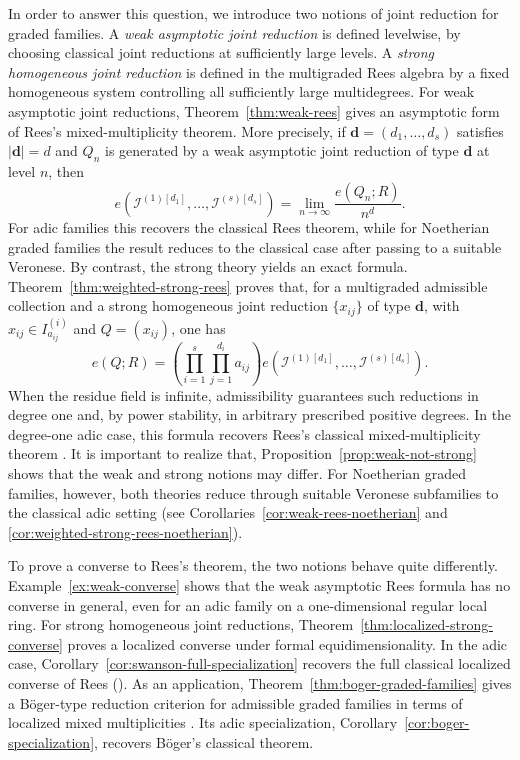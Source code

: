 \documentclass[reqno,12pt]{amsart}
\theoremstyle{plain}
\theoremstyle{definition}
\theoremstyle{remark}
\numberwithin{equation}{section}
\begin{document}
In order to answer this question, we introduce two notions of joint reduction for
graded families. A \emph{weak asymptotic joint reduction} is defined
levelwise, by choosing classical joint reductions at sufficiently large
levels. A \emph{strong homogeneous joint reduction} is defined in the
multigraded Rees algebra by a fixed homogeneous system controlling all
sufficiently large multidegrees. For weak asymptotic joint reductions, Theorem~\ref{thm:weak-rees}
gives an asymptotic form of Rees's mixed-multiplicity theorem. More
precisely, if $\mathbf d=(d_1,\ldots,d_s)$ satisfies $|\mathbf d|=d$
and $Q_n$ is generated by a weak asymptotic joint reduction of type
$\mathbf d$ at level $n$, then
\[
e\!\left(
\mathcal I^{(1)[d_1]},\ldots,
\mathcal I^{(s)[d_s]}
\right)
=
\lim_{n\to\infty}\frac{e(Q_n;R)}{n^d}.
\]
For adic families this recovers the classical Rees theorem, while for
Noetherian graded families the result reduces to the classical case
after passing to a suitable Veronese. By contrast, the strong theory yields an exact formula.
Theorem~\ref{thm:weighted-strong-rees} proves that, for a multigraded
admissible collection and a strong homogeneous joint reduction
$\{x_{ij}\}$ of type $\mathbf d$, with
$x_{ij}\in I_{a_{ij}}^{(i)}$ and $Q=(x_{ij})$, one has
\[
e(Q;R)
=
\left(
\prod_{i=1}^{s}\prod_{j=1}^{d_i}a_{ij}
\right)
e\!\left(
\mathcal I^{(1)[d_1]},\ldots,
\mathcal I^{(s)[d_s]}
\right).
\]
When the residue field is infinite, admissibility guarantees such
reductions in degree one and, by power stability, in arbitrary
prescribed positive degrees. In the degree-one adic case, this formula
recovers Rees's classical mixed-multiplicity theorem
\cite[Theorem~17.4.9]{SwansonHuneke}. It is important to realize that, Proposition~\ref{prop:weak-not-strong} shows that the weak and strong
notions may differ. For Noetherian graded families, however, both
theories reduce through suitable Veronese subfamilies to the classical
adic setting (see Corollaries~\ref{cor:weak-rees-noetherian} and
\ref{cor:weighted-strong-rees-noetherian}).

To prove a converse to Rees's theorem, the two notions behave quite
differently. Example~\ref{ex:weak-converse} shows that the weak
asymptotic Rees formula has no converse in general, even for an adic
family on a one-dimensional regular local ring. For strong homogeneous joint reductions,
Theorem~\ref{thm:localized-strong-converse} proves a localized converse
under formal equidimensionality. In the adic case,  Corollary~\ref{cor:swanson-full-specialization} recovers the full classical
localized converse of Rees
(\cite[Theorem~17.6.1]{SwansonHuneke}). As an application,
Theorem~\ref{thm:boger-graded-families} gives a B\"oger-type reduction
criterion for admissible graded families in terms of localized mixed
multiplicities \cite{Boger1969}. Its adic specialization,
Corollary~\ref{cor:boger-specialization}, recovers B\"oger's classical
theorem.
\end{document}
